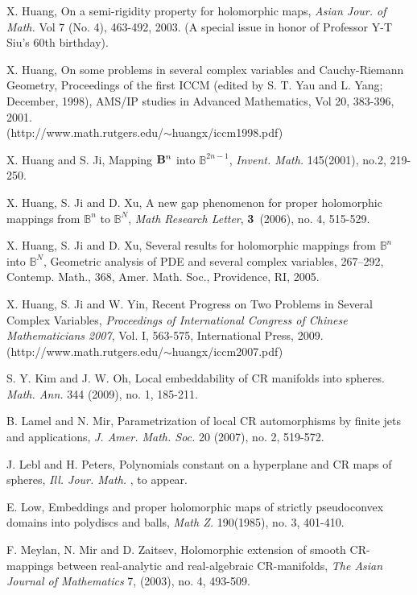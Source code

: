 \documentclass[12pt]{article}
\numberwithin{equation}{section}
\def\BB{{\mathbb B}}
\begin{document}
\begin{thebibliography}{99999}
 X. Huang, { On a semi-rigidity property for holomorphic
maps},  {\it Asian Jour. of Math.} Vol 7 (No. 4), 463-492, 2003. (A special
issue in honor of Professor Y-T Siu's 60th birthday).

 X. Huang, On some problems in several complex variables
and Cauchy-Riemann Geometry, {Proceedings of the first ICCM} (edited
by S. T. Yau and L. Yang; December, 1998), AMS/IP studies in
Advanced Mathematics, Vol 20, 383-396, 2001.\\
(http://www.math.rutgers.edu/$\sim$huangx/iccm1998.pdf)

 X. Huang and S. Ji, { Mapping ${\bf{B}}^n$ into
${\BB}^{2n-1}$}, {\it Invent. Math.} 145(2001), no.2, 219-250.

  X. Huang, S. Ji and D. Xu, {A new gap
  phenomenon for proper holomorphic mappings from $\BB^n$ to
  $\BB^N$}, {\it Math Research Letter}, \textbf{3}\ (2006), no. 4, 515-529.

 X. Huang, S. Ji and D. Xu, { Several results for
holomorphic mappings from ${\BB}^n$ into ${\BB}^N$},
 Geometric analysis of PDE and several complex variables, 267–292,
 Contemp. Math., 368, Amer. Math. Soc., Providence, RI, 2005.

X. Huang, S. Ji and W. Yin, { Recent Progress on Two Problems in
Several Complex Variables}, {\it Proceedings of International
Congress of Chinese Mathematicians 2007}, Vol. I, 563-575,
International Press, 2009. \\
(http://www.math.rutgers.edu/$\sim$huangx/iccm2007.pdf)

S. Y. Kim and J. W. Oh, Local embeddability of CR manifolds into
spheres. {\it Math. Ann. }344 (2009), no. 1, 185-211.

B. Lamel and N. Mir,  Parametrization of local CR automorphisms by
finite jets and applications, {\it J. Amer. Math. Soc.} 20 (2007),
no. 2, 519-572.

 J. Lebl and H. Peters, Polynomials constant on a hyperplane and CR maps of
spheres, {\it Ill. Jour. Math. }, to appear.

 E. Low, Embeddings and proper holomorphic maps of
strictly pseudoconvex domains into polydiscs and balls, {\it Math
Z.} 190(1985), no. 3, 401-410.

 F. Meylan, N. Mir and D. Zaitsev, Holomorphic
extension of smooth CR-mappings between real-analytic and real-algebraic
CR-manifolds, {\it The Asian Journal of Mathematics} 7, (2003), no. 4, 493-509.


\end{thebibliography}
\end{document}
